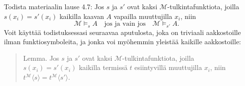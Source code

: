 \documentclass[11pt,a4paper]{amsart}
\begin{document}
\begin{exercise}
  Todista materiaalin lause 4.7: Jos \(s\) ja \(s'\) ovat kaksi
  \(\mathcal M\)-tulkintafunktiota, joilla \(s(x_i) = s'(x_i)\) kaikilla
  kaavan \(A\) vapailla muuttujilla \(x_i\), niin
  \[
    \mathcal M \models_s A
    \quad\text{jos ja vain jos}\quad
    \mathcal M \models_{s'} A.
  \]
  Voit käyttää todistuksessasi seuraavaa aputulosta, joka on triviaali
  aakkostoille ilman funktiosymboleita, ja jonka voi myöhemmin yleistää
  kaikille aakkostoille:
  \begin{quote}
    Lemma. Jos \(s\) ja \(s'\) ovat kaksi \(\mathcal M\)-tulkintafunktiota,
    joilla \(s(x_i) = s'(x_i)\) kaikilla termissä \(t\) esiintyvillä
    muuttujilla \(x_i\), niin
    \(t^{\mathcal M}\langle s\rangle = t^{\mathcal M}\langle s'\rangle\).
  \end{quote}
\end{exercise}
\end{document}
